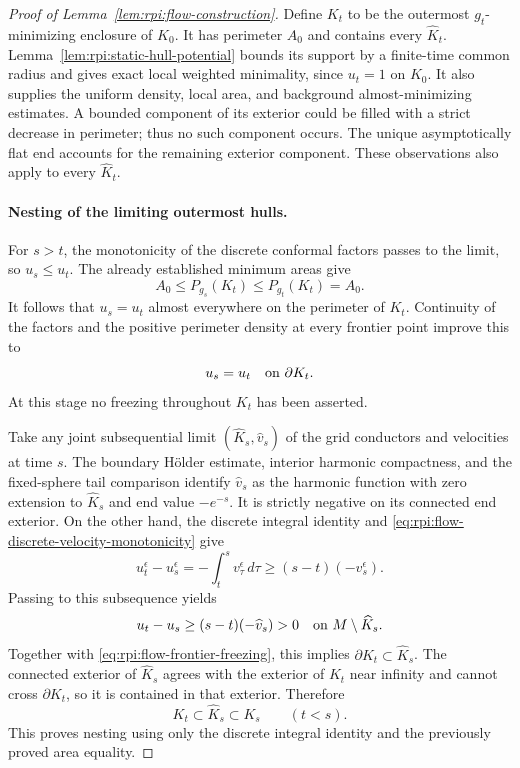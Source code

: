 \begin{proof}[Proof of Lemma~\ref{lem:rpi:flow-construction}]
Define $K_t$ to be the outermost $g_t$-minimizing enclosure of
$K_0$. It has perimeter $A_0$ and contains every $\widehat K_t$.
Lemma~\ref{lem:rpi:static-hull-potential} bounds its support by a
finite-time common radius and gives exact local weighted minimality,
since $u_t=1$ on $K_0$. It also supplies the uniform density, local
area, and background almost-minimizing estimates. A bounded component
of its exterior
could be filled with a strict decrease in perimeter; thus no such
component occurs. The unique asymptotically flat end accounts for
the remaining exterior component. These observations also apply
to every $\widehat K_t$.

\paragraph{Nesting of the limiting outermost hulls.}
For $s>t$, the monotonicity of the discrete conformal factors passes
to the limit, so $u_s\le u_t$. The already established minimum
areas give
\[
 A_0\le P_{g_s}(K_t)\le P_{g_t}(K_t)=A_0.
\]
It follows that $u_s=u_t$ almost everywhere on the perimeter of
$K_t$. Continuity of the factors and the positive perimeter density
at every frontier point improve this to
\begin{equation}
\label{eq:rpi:flow-frontier-freezing}
 u_s=u_t\quad\hbox{on }\partial K_t.
\end{equation}
At this stage no freezing throughout $K_t$ has been asserted.

Take any joint subsequential limit
$(\widehat K_s,\widehat v_s)$ of the grid conductors and velocities
at time $s$. The boundary H\"older estimate, interior harmonic
compactness, and the fixed-sphere tail comparison identify
$\widehat v_s$ as the harmonic function with zero extension to
$\widehat K_s$ and end value $-e^{-s}$. It is strictly negative
on its connected end exterior. On the other hand, the discrete
integral identity and
\eqref{eq:rpi:flow-discrete-velocity-monotonicity} give
\[
 u_t^\epsilon-u_s^\epsilon
   =-\int_t^s v_\tau^\epsilon\,d\tau
   \ge(s-t)(-v_s^\epsilon).
\]
Passing to this subsequence yields
\[
 u_t-u_s\ge(s-t)(-\widehat v_s)>0
       \quad\hbox{on }M\setminus\widehat K_s.
\]
Together with \eqref{eq:rpi:flow-frontier-freezing}, this implies
$\partial K_t\subset\widehat K_s$. The connected exterior of
$\widehat K_s$ agrees with the exterior of $K_t$ near infinity and
cannot cross $\partial K_t$, so it is contained in that exterior.
Therefore
\begin{equation}
\label{eq:rpi:flow-limit-squeeze}
 K_t\subset\widehat K_s\subset K_s\qquad(t<s).
\end{equation}
This proves nesting using only the discrete integral identity and
the previously proved area equality.


\end{proof}
